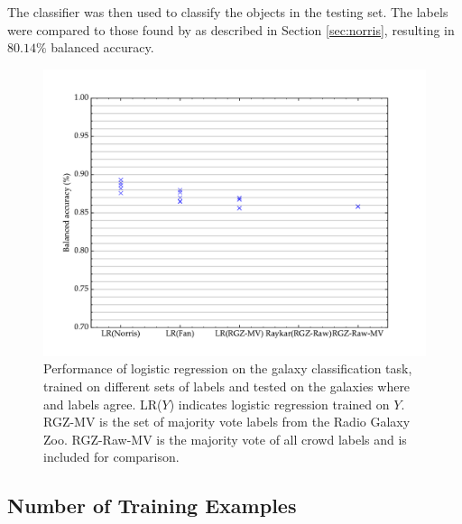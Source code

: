     The classifier was then used to classify the objects in the testing set. The
    labels were compared to those found by \citet{norris06} as described in
    Section \ref{sec:norris}, resulting in $80.14\%$ balanced accuracy.


    \begin{figure}[!ht]
      \centering
      \includegraphics[width=\textwidth]{images/experiments/predictors.pdf}
      \caption{Performance of logistic regression on the galaxy classification
        task, trained on different sets of labels and tested on the galaxies
        where \citeauthor{norris06} and \citeauthor{fan15} labels agree. LR($Y$)
        indicates logistic regression trained on $Y$. RGZ-MV is the set of
        majority vote labels from the Radio Galaxy Zoo. RGZ-Raw-MV is the
        majority vote of all crowd labels and is included for comparison.}
    \end{figure}

  \subsection{Number of Training Examples}

